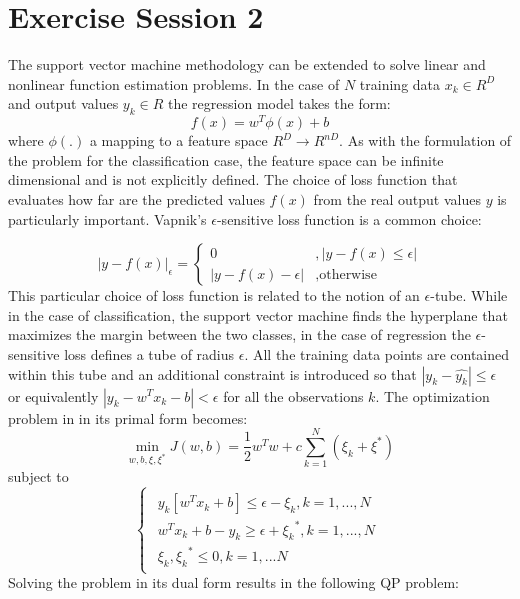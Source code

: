 \documentclass[conference,compsoc]{IEEEtran}
\begin{document}
\clearpage
\section{Exercise Session 2}

The support vector machine methodology can be extended to solve linear and nonlinear function estimation problems. In the case of $N$ training data $x_k \in R^D$ and output values $y_k \in R$ the regression model takes the form: 
\begin{equation}
f(x)=w^T\phi(x)+b
\end{equation}
where $\phi(.) $ a mapping to a feature space $R^D \rightarrow R^{nD}$. As with the formulation of the problem for the classification case, the feature space can be infinite dimensional and is not explicitly defined.
The choice of loss function that evaluates how far are the predicted values $f(x)$ from the real output values $y$ is particularly important. Vapnik's $\epsilon$-sensitive loss function is a common choice:


\begin{equation}
|y-f(x)|_{\epsilon} = \begin{cases}
0 & \text{$,|y-f(x) \leq \epsilon|$}\\
|y-f(x)-\epsilon| &\text{,otherwise}
\end{cases}
\end{equation}
This particular choice of loss function is related to the notion of an $\epsilon$-tube. While in the case of classification, the support vector machine finds the hyperplane that maximizes the margin between the two classes, in the case of regression the $\epsilon$-sensitive loss defines a tube of radius $\epsilon$. All the training data points are contained within this tube and an additional constraint is introduced so that  
$|y_k-\hat{y_k}|\leq \epsilon$ or equivalently $|y_k-w^Tx_k-b|<\epsilon$ for all the observations $k$. The optimization problem in in its primal form becomes:
\begin{equation}
\min\limits_{w,b,\xi,\xi^*} J(w,b) = \frac{1}{2}w^Tw + c \sum_{k=1}^{N}(\xi_k+\xi^*)
\end{equation}
subject to
\begin{equation*}
\begin{cases}
\begin{aligned}
  y_k[w^Tx_k+b] \leq \epsilon-\xi_k, k=1,...,N \\
   w^Tx_k+b -y_k \geq \epsilon+ {\xi_k}^{*}, k=1,...,N \\
  \xi_k,{\xi_k}^{*} \leq 0, k =1,...N
\end{aligned}
\end{cases}
\end{equation*}
Solving the problem in its dual form results in the following QP problem:
\end{document}
